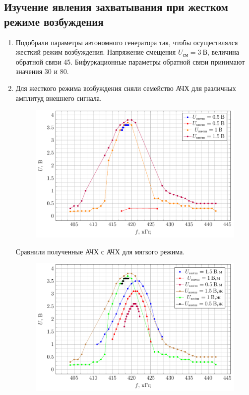 \documentclass[a4paper,14pt]{extarticle}
\begin{document}
\subsection*{Изучение явления захватывания при жестком режиме возбуждения}
\begin{enumerate}
	\item 
	Подобрали параметры автономного генератора так, чтобы осуществлялся жесткий режим возбуждения.
	Напряжение смещения $U_\text{см}=3\:\text{В}$, величина обратной связи 45. Бифуркационные параметры обратной связи принимают значения 30 и 80.
	\item
	Для жесткого режима возбуждения сняли семейство АЧХ для различных амплитуд внешнего сигнала. 
	\begin{figure}[H]
		\centering
		\includegraphics[width=\linewidth]{plots/fig3_2a}
	\end{figure}
	Сравнили полученные АЧХ с АЧХ для мягкого режима.
	\begin{figure}[H]
		\centering
		\includegraphics[width=\linewidth]{plots/fig3comm}
	\end{figure}
\end{enumerate} 
\end{document}
